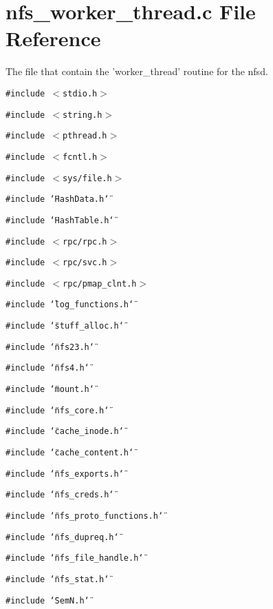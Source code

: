 \section{nfs\_\-worker\_\-thread.c File Reference}
\label{nfs__worker__thread_8c}
The file that contain the 'worker\_\-thread' routine for the nfsd. 

{\tt \#include $<$stdio.h$>$}\par
{\tt \#include $<$string.h$>$}\par
{\tt \#include $<$pthread.h$>$}\par
{\tt \#include $<$fcntl.h$>$}\par
{\tt \#include $<$sys/file.h$>$}\par
{\tt \#include \char`\"{}Hash\-Data.h\char`\"{}}\par
{\tt \#include \char`\"{}Hash\-Table.h\char`\"{}}\par
{\tt \#include $<$rpc/rpc.h$>$}\par
{\tt \#include $<$rpc/svc.h$>$}\par
{\tt \#include $<$rpc/pmap\_\-clnt.h$>$}\par
{\tt \#include \char`\"{}log\_\-functions.h\char`\"{}}\par
{\tt \#include \char`\"{}stuff\_\-alloc.h\char`\"{}}\par
{\tt \#include \char`\"{}nfs23.h\char`\"{}}\par
{\tt \#include \char`\"{}nfs4.h\char`\"{}}\par
{\tt \#include \char`\"{}mount.h\char`\"{}}\par
{\tt \#include \char`\"{}nfs\_\-core.h\char`\"{}}\par
{\tt \#include \char`\"{}cache\_\-inode.h\char`\"{}}\par
{\tt \#include \char`\"{}cache\_\-content.h\char`\"{}}\par
{\tt \#include \char`\"{}nfs\_\-exports.h\char`\"{}}\par
{\tt \#include \char`\"{}nfs\_\-creds.h\char`\"{}}\par
{\tt \#include \char`\"{}nfs\_\-proto\_\-functions.h\char`\"{}}\par
{\tt \#include \char`\"{}nfs\_\-dupreq.h\char`\"{}}\par
{\tt \#include \char`\"{}nfs\_\-file\_\-handle.h\char`\"{}}\par
{\tt \#include \char`\"{}nfs\_\-stat.h\char`\"{}}\par
{\tt \#include \char`\"{}Sem\-N.h\char`\"{}}\par
